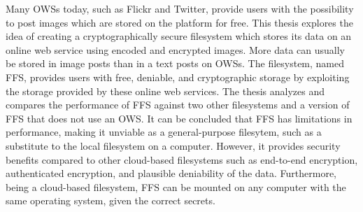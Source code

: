 




Many \gls{OWS}s today, such as Flickr and Twitter, provide users with the possibility to post images which are stored on the platform for free. This thesis explores the idea of creating a cryptographically secure filesystem which stores its data on an online web service using encoded and encrypted images. More data can usually be stored in image posts than in a text posts on \gls{OWS}s. The filesystem, named \gls{FFS}, provides users with free, deniable, and cryptographic storage by exploiting the storage provided by these online web services. The thesis analyzes and compares the performance of \gls{FFS} against two other filesystems and a version of \gls{FFS} that does not use an \gls{OWS}. It can be concluded that \gls{FFS} has limitations in performance, making it unviable as a \mbox{general-purpose} filesytem, such as a substitute to the local filesystem on a computer. However, it provides security benefits compared to other \mbox{cloud-based} filesystems such as \mbox{end-to-end} encryption, authenticated encryption, and plausible deniability of the data. Furthermore, being a \mbox{cloud-based} filesystem, \gls{FFS} can be mounted on any computer with the same operating system, given the correct secrets. 

